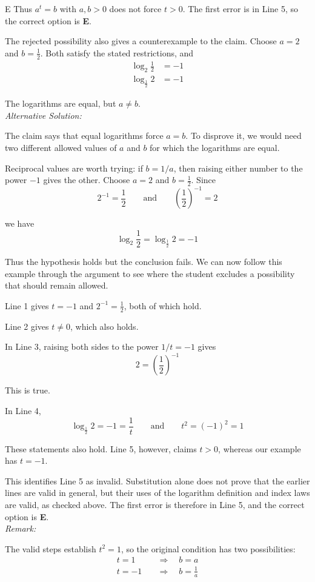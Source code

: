 \documentclass[11pt,a4paper]{article}
\begin{document}
\begin{enumerate}[label=\textbf{\arabic*.},leftmargin=*,itemsep=0pt,start=12]
\begin{djsSolution}{E}
Thus $a^t=b$ with $a,b>0$ does not force $t>0$. The first error is in Line 5, so the correct option is \textbf{E}.

The rejected possibility also gives a counterexample to the claim. Choose $a=2$ and $b=\frac12$. Both satisfy the stated restrictions, and
\[
\begin{aligned}
\log_2\frac12&=-1\\[5pt]
\log_{\frac12}2&=-1
\end{aligned}
\]

The logarithms are equal, but $a\ne b$.\\[5pt]

\textit{Alternative Solution:}

The claim says that equal logarithms force $a=b$. To disprove it, we would need two different allowed values of $a$ and $b$ for which the logarithms are equal.

Reciprocal values are worth trying: if $b=1/a$, then raising either number to the power $-1$ gives the other. Choose $a=2$ and $b=\frac12$. Since
\[
2^{-1}=\frac12
\qquad\text{and}\qquad
\left(\frac12\right)^{-1}=2
\]

we have
\[
\log_2\frac12=\log_{\frac12}2=-1
\]

Thus the hypothesis holds but the conclusion fails. We can now follow this example through the argument to see where the student excludes a possibility that should remain allowed.

Line 1 gives $t=-1$ and $2^{-1}=\frac12$, both of which hold.

Line 2 gives $t\ne0$, which also holds.

In Line 3, raising both sides to the power $1/t=-1$ gives
\[
2=\left(\frac12\right)^{-1}
\]

This is true.

In Line 4,
\[
\log_{\frac12}2=-1=\frac1t
\qquad\text{and}\qquad
t^2=(-1)^2=1
\]

These statements also hold. Line 5, however, claims $t>0$, whereas our example has $t=-1$.

This identifies Line 5 as invalid. Substitution alone does not prove that the earlier lines are valid in general, but their uses of the logarithm definition and index laws are valid, as checked above. The first error is therefore in Line 5, and the correct option is \textbf{E}.\\[5pt]

\textit{Remark:}

The valid steps establish $t^2=1$, so the original condition has two possibilities:
\[
\begin{aligned}
t=1&\quad\Longrightarrow\quad b=a\\[5pt]
t=-1&\quad\Longrightarrow\quad b=\frac1a
\end{aligned}
\]


\end{djsSolution}
\end{enumerate}
\end{document}
